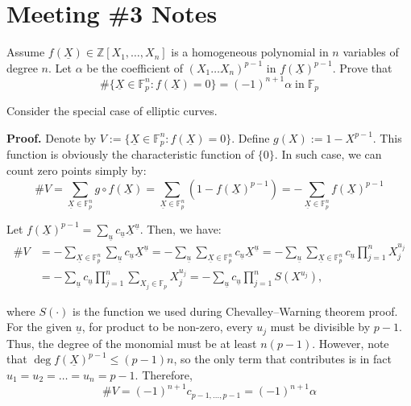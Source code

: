\documentclass{template}
\begin{document}
\section{Meeting \#3 Notes}

\begin{problem}
    Assume $f(\underline{X}) \in \mathbb{Z}[X_1,\dots,X_n]$ is a homogeneous 
    polynomial in $n$ variables of degree $n$. Let $\alpha$ be the 
    coefficient of $(X_1\dots X_n)^{p-1}$ in $f(\underline{X})^{p-1}$. Prove 
    that
    \begin{equation*}
        \#\{\underline{X} \in \mathbb{F}_p^n: f(\underline{X}) = 0\} = (-1)^{n+1}\alpha \; \text{in} \; \mathbb{F}_p
    \end{equation*}

    Consider the special case of elliptic curves.
\end{problem}

\textbf{Proof.} Denote by $V := \{\underline{X} \in \mathbb{F}_p^n:
f(\underline{X}) = 0\}$. Define $g(X) := 1 - X^{p-1}$. This function is
obviously the characteristic function of $\{0\}$. In such case, we can count
zero points simply by:
\begin{equation*}
    \# V = \sum_{\underline{X} \in \mathbb{F}_p^n} g \circ f(\underline{X}) = \sum_{\underline{X} \in \mathbb{F}_p^n} (1-f(\underline{X})^{p-1}) = -\sum_{\underline{X} \in \mathbb{F}_p^n}f(\underline{X})^{p-1}
\end{equation*}

Let $f(\underline{X})^{p-1} = \sum_{\underline{u}}c_{\underline{u}}\underline{X}^{\underline{u}}$. Then, we have:
\begin{align*}
    \# V &= -\sum_{\underline{X} \in \mathbb{F}_p^n}\sum_{\underline{u}}c_{\underline{u}}\underline{X}^{\underline{u}} = -\sum_{\underline{u}}\sum_{\underline{X} \in \mathbb{F}_p^n}c_{\underline{u}}\underline{X}^{\underline{u}} = -\sum_{\underline{u}}\sum_{\underline{X} \in \mathbb{F}_p^n}c_{\underline{u}}\prod_{j=1}^n X_j^{u_j} \\
    &= -\sum_{\underline{u}}c_{\underline{u}}\prod_{j=1}^n \sum_{X_j \in \mathbb{F}_p}X_j^{u_j} = -\sum_{\underline{u}}c_{\underline{u}}\prod_{j=1}^n S(X^{u_j}),
\end{align*}

where $S(\cdot)$ is the function we used during Chevalley–Warning theorem proof.
For the given $\underline{u}$, for product to be non-zero, every $u_j$ must be
divisible by $p-1$. Thus, the degree of the monomial must be at least $n(p-1)$.
However, note that $\deg f(\underline{X})^{p-1} \leq (p-1)n$, so the only term 
that contributes is in fact $u_1=u_2=\dots=u_n=p-1$. Therefore,
\begin{equation*}
    \# V = (-1)^{n+1}c_{p-1,\dots,p-1} = (-1)^{n+1}\alpha
\end{equation*}
\end{document}
